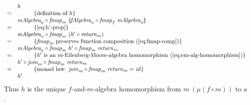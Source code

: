 \documentclass{jfp1}
\newcommand{\fold}[1]{\llparenthesis #1 \rrparenthesis}
\newcommand{\eqAnnotationS}[1]{\hspace{1cm}\left\{\textrm{#1}\right\}}
\begin{document}
\begin{proof*}
\begin{enumerate}
\begin{displaymath}
      \begin{array}{cl}
        & h \\
        =&\eqAnnotationS{definition of $h$} \\
        &\mathit{mAlgebra}_a \circ \mathit{fmap}_m~\fold{\mathit{fAlgebra}_a \circ \mathit{fmap}_f~\mathit{mAlgebra}_a} \\
        =&\eqAnnotationS{\autoref{eq:h'-prop}} \\
        &\mathit{mAlgebra}_a \circ \mathit{fmap}_m~(h' \circ \mathit{return}_m) \\
        =&\eqAnnotationS{$\mathit{fmap}_m$ preserves function composition (\autoref{eq:fmap-comp})} \\
        &\mathit{mAlgebra}_a \circ \mathit{fmap}_m~{h'} \circ \mathit{fmap}_m~\mathit{return}_m \\
        =&\eqAnnotationS{$h'$ is an $m$-Eilenberg-Moore-algebra homomorphism (\autoref{eq:em-alg-homomorphism})} \\
        &h' \circ \mathit{join}_m \circ \mathit{fmap}_m~\mathit{return}_m \\
        =&\eqAnnotationS{monad law: $\mathit{join}_m \circ \mathit{fmap}_m~\mathit{return}_m = \mathit{id}$} \\
        &h'
      \end{array}
    \end{displaymath}
    Thus $h$ is the unique $f$-and-$m$-algebra homomorphism from
    $m~(\mu (f \circ m))$ to $a$. \mathproofbox
  \end{enumerate}
\end{proof*}
\end{document}
